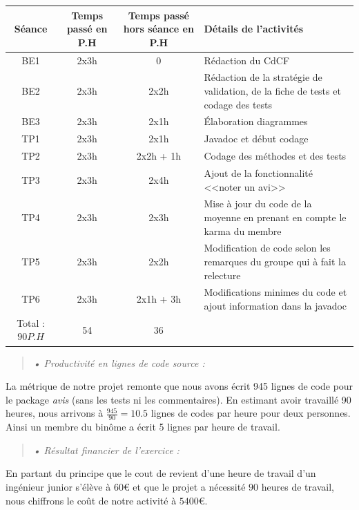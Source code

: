 \documentclass[12pt,a4paper]{report}
\begin{document}
\begin{flushleft}
\begin{tabular}{|c|c|c|p{3cm}|} 
\hline 
Séance & Temps passé en P.H & Temps passé hors séance en P.H & Détails de l'activités \\ 
\hline 
BE1 & 2x3h & 0 & Rédaction du CdCF \\ 
\hline 
BE2 & 2x3h & 2x2h & Rédaction de la stratégie de validation, de la fiche de tests et codage des tests \\ 
\hline 
BE3 & 2x3h & 2x1h & Élaboration diagrammes \\ 
\hline 
TP1 & 2x3h & 2x1h & Javadoc et début codage \\ 
\hline 
TP2 & 2x3h & 2x2h + 1h & Codage des méthodes et des tests \\ 
\hline 
TP3 & 2x3h & 2x4h & Ajout de la fonctionnalité <<noter un avi>> \\ 
\hline 
TP4 & 2x3h & 2x3h & Mise à jour du code de la moyenne en prenant en compte le karma du membre  \\ 
\hline 
TP5 & 2x3h & 2x2h & Modification de code selon les remarques du groupe qui à fait la relecture \\
\hline 
TP6 & 2x3h & 2x1h + 3h & Modifications minimes du code et ajout information dans la javadoc\\
\hline
Total : $90 P.H$ & 54  & 36 &\\ 
\hline 
\end{tabular} 
\end{flushleft}

\begin{quotation}
\textit{• Productivité en lignes de code source :}
\end{quotation}

La métrique de notre projet remonte que nous avons écrit 945 lignes de code pour le package \emph{avis} (sans les tests ni les commentaires). En estimant avoir travaillé 90 heures, nous arrivons à $\frac{945}{90} = 10.5$ lignes de codes par heure pour deux personnes. Ainsi un membre du binôme a écrit 5 lignes par heure de travail. 

\begin{quotation}
\textit{• Résultat financier de l'exercice :}
\end{quotation}

En partant du principe que le cout de revient d'une heure de travail d'un ingénieur junior s'élève à 60\euro{}  et que le projet a nécessité $90$ heures de travail, nous chiffrons le coût de notre activité à $5400$\euro{}. 
\end{document}
